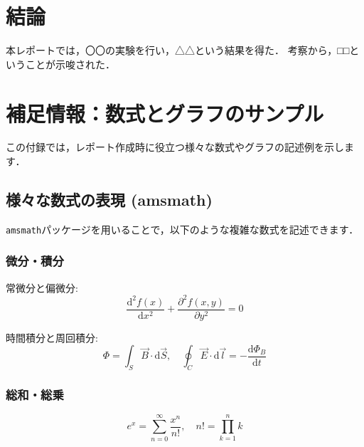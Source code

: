 \documentclass[
  a4paper,  %
  11pt,     %
]{ltjsarticle}%
\begin{document}
\section{結論}
本レポートでは，〇〇の実験を行い，△△という結果を得た．
考察から，□□ということが示唆された．

\clearpage
\appendix %
\section{補足情報：数式とグラフのサンプル}

この付録では，レポート作成時に役立つ様々な数式やグラフの記述例を示します．

\subsection{様々な数式の表現 (amsmath)}
\verb|amsmath|パッケージを用いることで，以下のような複雑な数式を記述できます．

\subsubsection{微分・積分}

常微分と偏微分:
\begin{equation}
  \frac{\mathrm{d}^2 f(x)}{\mathrm{d}x^2} + \frac{\partial^2 f(x,y)}{\partial y^2} = 0
\end{equation}

時間積分と周回積分:
\begin{equation}
  \Phi = \int_S \vec{B} \cdot \mathrm{d}\vec{S}, \quad \oint_C \vec{E} \cdot \mathrm{d}\vec{l} = -\frac{\mathrm{d}\Phi_B}{\mathrm{d}t}
\end{equation}

\subsubsection{総和・総乗}

\begin{equation}
  e^x = \sum_{n=0}^{\infty} \frac{x^n}{n!}, \quad n! = \prod_{k=1}^{n} k
\end{equation}
\end{document}

